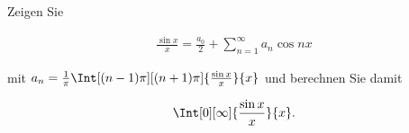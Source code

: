 
\begin{exercise}

Zeigen Sie

\begin{align*}
    \frac{\sin x}{x}
    =
    \frac{a_0}{2}
    +
    \sum_{n=1}^\infty
    a_n
    \cos{n x}
\end{align*}

mit $a_n = \frac{1}{\pi} \Int[(n - 1) \pi][(n + 1) \pi]{\frac{\sin x}{x}}{x}$ und berechnen Sie damit

\begin{align*}
    \Int[0][\infty]{\frac{\sin x}{x}}{x}.
\end{align*}

\end{exercise}


